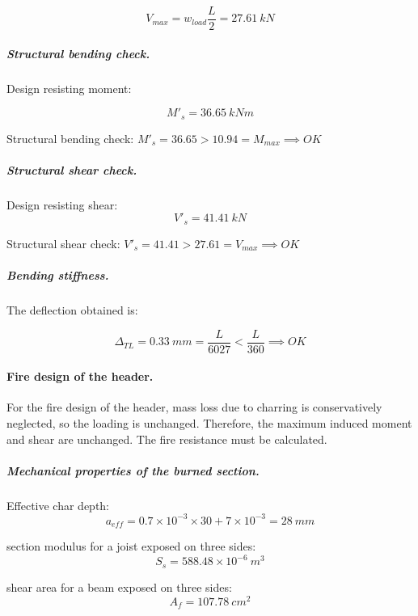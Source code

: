 \begin{equation}
  V_{max}= w_{load} \frac{L}{2}= 27.61\ kN
\end{equation}

\subparagraph{Structural bending check.}

\noindent Design resisting moment:

\begin{equation}
  M'_s= 36.65\ kN m
\end{equation}

\noindent Structural bending check: $M'_s = 36.65 > 10.94 = M_{max} \implies OK$

\subparagraph{Structural shear check.}

\noindent Design resisting shear:
\begin{equation}
  V'_s= 41.41\ kN
\end{equation}

\noindent Structural shear check: $V'_s = 41.41 > 27.61 = V_{max} \implies OK$

\subparagraph{Bending stiffness.}
The deflection obtained is:

\begin{equation}
  \Delta_{TL}= 0.33\ mm= \frac{L}{6027} < \frac{L}{360} \implies OK
\end{equation}

\paragraph{Fire design of the header.}
For the fire design of the header, mass loss due to charring is conservatively neglected, so the loading is unchanged. Therefore, the maximum induced moment and shear are unchanged. The fire resistance must be calculated.

\subparagraph{Mechanical properties of the burned section.}

\noindent Effective char depth:
\begin{equation}
  a_{eff}= 0.7 \times 10^{-3} \times 30 + 7 \times 10^{-3}= 28\ mm
\end{equation}

\noindent section modulus for a joist exposed on three sides:
\begin{equation}
  S_s= 588.48 \times 10^{-6}\ m^3
\end{equation}

\noindent shear area for a beam exposed on three sides:
\begin{equation}
  A_f= 107.78\ cm^2
\end{equation}

